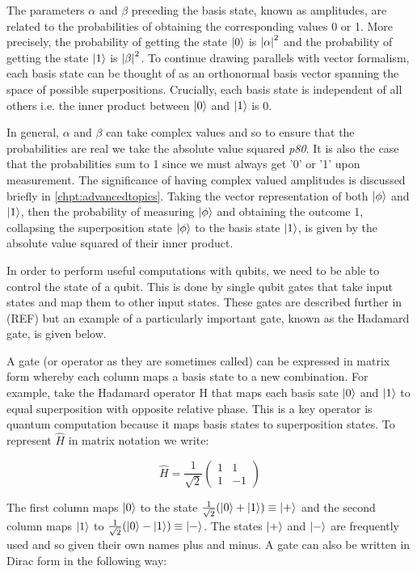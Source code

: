 The parameters $\alpha$ and $\beta$ preceding the basis state, known as amplitudes, are related to the probabilities of obtaining the corresponding values 0 or 1. More precisely, the probability of getting the state $\left\vert{0}\right\rangle$ is $\abs{\alpha}^{2}$ and the probability of getting the state $\left\vert{1}\right\rangle$ is $\abs{\beta}^{2}$. To continue drawing parallels with vector formalism, each basis state can be thought of as an orthonormal basis vector spanning the space of possible superpositions. Crucially, each basis state is independent of all others i.e. the inner product between $\left\vert{0}\right\rangle$ and $\left\vert{1}\right\rangle$ is 0.


In general, $\alpha$ and $\beta$ can take complex values and so to ensure that the probabilities are real we take the absolute value squared \cite{nielsen_chuang_2010} \textit{p80}. It is also the case that the probabilities sum to 1 since we must always get '0' or '1' upon measurement. The significance of having complex valued amplitudes is discussed briefly in \autoref{chpt:advancedtopics}. Taking the vector representation of both $\left\vert{\phi}\right\rangle$ and $\left\vert{1}\right\rangle$, then the probability of measuring $\left\vert{\phi}\right\rangle$ and obtaining the outcome 1, collapsing the superposition state $\left\vert{\phi}\right\rangle$ to the basis state $\left\vert{1}\right\rangle$, is given by the absolute value squared of their inner product.

In order to perform useful computations with qubits, we need to be able to control the state of a qubit. This is done by single qubit gates that take input states and map them to other input states. These gates are described further in (REF) but an example of a particularly important gate, known as the Hadamard gate, is given below.

A gate (or operator as they are sometimes called) can be expressed in matrix form whereby each column maps a basis state to a new combination. For example, take the Hadamard operator H that maps each basis sate $\left\vert{0}\right\rangle$ and $\left\vert{1}\right\rangle$ to equal superposition with opposite relative phase. This is a key operator is quantum computation because it maps basis states to superposition states. To represent $\hat{H}$ in matrix notation we write:

\begin{equation}
    \hat{H} = \frac{1}{\sqrt{2}}\begin{pmatrix}1 & 1\\
    1 & -1\end{pmatrix}
\end{equation}

The first column maps $\left\vert{0}\right\rangle$ to the state $\frac{1}{\sqrt{2}}(\left\vert{0}\right\rangle+\left\vert{1}\right\rangle)\equiv\left\vert{+}\right\rangle$ and the second column maps $\left\vert{1}\right\rangle$ to $\frac{1}{\sqrt{2}}(\left\vert{0}\right\rangle-\left\vert{1}\right\rangle)\equiv\left\vert{-}\right\rangle$. The states $\left\vert{+}\right\rangle$ and $\left\vert{-}\right\rangle$ are frequently used and so given their own names plus and minus. A gate can also be written in Dirac form in the following way:

